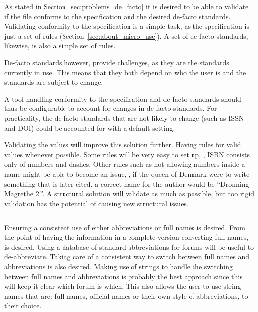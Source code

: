 As stated in Section~\ref{sec:problems_de_facto} it is desired to be
able to validate if the file conforms to the specification and the
desired de-facto standards.  Validating conformity to the
specification is a simple task, as the specification is just a set of
rules (Section~\ref{sec:about_micro_use}).  A set of de-facto
standards, likewise, is also a simple set of rules.

De-facto standards however, provide challenges, as they are the
standards currently in use.  This means that they both depend on who
the user is and the standards are subject to change.

A tool handling conformity to the specification and de-facto standards
should thus be configurable to account for changes in de-facto
standards.  For practicality, the de-facto standards that are not
likely to change (such as ISSN and DOI) could be accounted for with a
default setting.

Validating the values will improve this solution further.  Having
rules for valid values whenever possible.  Some rules will be very
easy to set up, \eg, ISBN consists only of numbers and dashes.  Other
rules such as not allowing numbers inside a name might be able to
become an issue, \eg, if the queen of Denmark were to write something
that is later cited, a correct name for the author would be ``Dronning
Magrethe 2.''.  A structural solution will validate as much as
possible, but too rigid validation has the potential of causing new
structural issues.


\subsection{}

Ensuring a consistent use of either abbreviations or full names is
desired.  From the point of having the information in a complete
version converting full names,  is desired.
Using a database of standard abbreviations for forums will be useful
to de-abbreviate.  Taking care of a consistent way to switch between
full names and abbreviations is also desired.  Making use of strings
to handle the switching between full names and abbreviations is
probably the best approach since this will keep it clear which forum
is which.  This also allows the user to use string names that are:
full names, official names or their own style of abbreviations, to
their choice.


\subsection{}

